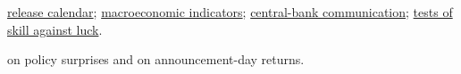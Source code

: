 \begin{qfmethod}
 \hyperref[data:us-macro-release-calendar]{release calendar}; \hyperref[def:macroeconomic-indicators]{macroeconomic indicators}; \hyperref[def:central-bank-policy-framework]{central-bank communication}; \hyperref[meth:skill-luck-significance-tests]{tests of skill against luck}.

 \citep{rt-kuttner-2001} on policy surprises and \citep{wide-savor-wilson-announcements} on announcement-day returns.

\end{qfmethod}
